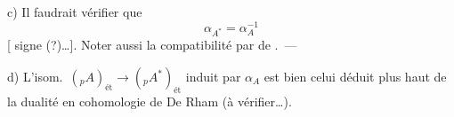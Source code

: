 \documentclass[11pt,a4paper]{article}
\begin{document}
c) Il faudrait vérifier que
\[
\alpha_{A^*} = \alpha_A^{-1}
\]
[ signe (?)\ldots]. Noter aussi la compatibilité par \ill{} de
.\ ---

d) L'isom.\ $({}_{p}A)_{\text{ét}} \to ({}_{p}A^*)_{\text{ét}}$ induit par
$\alpha_A$ est bien celui déduit plus haut de la dualité en cohomologie de De
Rham (à vérifier\ldots).
\end{document}
